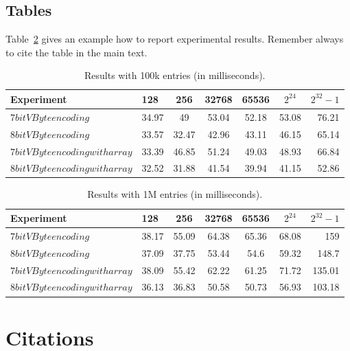 \section{Tables}

Table~\ref{table:results} gives an example how to report experimental results. Remember always to cite the table in the main text. 

\begin{table}
\centering
\caption{Results with 100k entries (in milliseconds).\label{table:results}}
\begin{tabular}{l||l c c c c r} 
Experiment & 128 & 256 & 32768 & 65536 & $2^{24}$ & $2^{32} -1$\\ 
\hline \hline 
$7bit VByte encoding$ & 34.97 & 49 & 53.04 & 52.18 & 53.08 & 76.21\\
$8bit VByte encoding$ & 33.57 & 32.47 & 42.96 & 43.11 & 46.15 & 65.14\\
$7bit VByte encoding with array$ & 33.39 & 46.85 & 51.24 & 49.03 & 48.93 & 66.84 \\
$8bit VByte encoding with array$ & 32.52 & 31.88 & 41.54 & 39.94 & 41.15 & 52.86 \\

\hline
%
\end{tabular}
\end{table}

\begin{table}
\centering
\caption{Results with 1M entries (in milliseconds).\label{table:results}}
\begin{tabular}{l||l c c c c r} 
Experiment & 128 & 256 & 32768 & 65536 & $2^{24}$ & $2^{32} -1$ \\ 
\hline \hline 
$7bit VByte encoding$ & 38.17 & 55.09 & 64.38 & 65.36 & 68.08 & 159 \\
$8bit VByte encoding$ & 37.09 & 37.75 & 53.44 & 54.6 & 59.32 & 148.7\\
$7bit VByte encoding with array$ & 38.09 & 55.42 & 62.22 & 61.25 & 71.72 & 135.01\\
$8bit VByte encoding with array$ & 36.13 & 36.83 & 50.58 & 50.73 & 56.93 & 103.18\\

\hline
%
\end{tabular}
\end{table}

\chapter{Citations}

